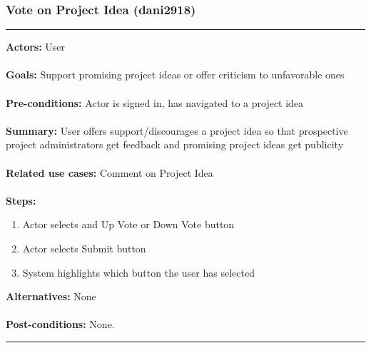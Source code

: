 \documentclass[11pt]{report}
\begin{document}
\subsubsection{Vote on Project Idea (dani2918)}
\vspace{2pt}
\hrule
\vspace{8pt}
 \textbf{Actors:} User \\ \\
\textbf{Goals:} Support promising project ideas or offer criticism to unfavorable ones  \\ \\
 \textbf{Pre-conditions:} Actor is signed in, has navigated to a project idea  \\ \\
 \textbf{Summary:}  User offers support/discourages a project idea so that prospective project administrators get feedback and promising project ideas get publicity \\ \\
\textbf{Related use cases:} Comment on Project Idea \\ \\
\textbf{Steps:} \begin{enumerate}
  \item Actor selects and Up Vote or Down Vote button
  \item Actor selects Submit button 
  \item System highlights which button the user has selected
 \end{enumerate}
 \textbf{Alternatives:} None \\ \\
 \textbf{Post-conditions:} None. \\
\vspace{8pt}
\hrule
\newpage
\end{document}

